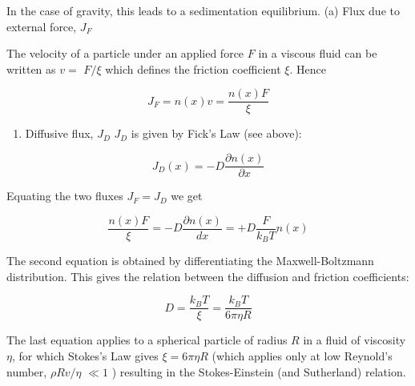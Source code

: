 \documentclass[
  letterpaper,
  enabledeprecatedfontcommands]{report}
\providecommand{\tightlist}{%
  \setlength{\itemsep}{0pt}\setlength{\parskip}{0pt}}
\begin{document}
In the case of gravity, this leads to a sedimentation equilibrium. (a)
Flux due to external force, \(J_{F}\)

The velocity of a particle under an applied force \(F\) in a viscous
fluid can be written as \(v=\) \(F / \xi\) which defines the friction
coefficient \(\xi\). Hence

\[
J_{F}=n(x) v=\frac{n(x) F}{\xi}
\]

\begin{enumerate}
\def\labelenumi{(\alph{enumi})}
\setcounter{enumi}{1}
\tightlist
\item
  Diffusive flux, \(J_{D}\) \(J_{D}\) is given by Fick's Law (see
  above):
\end{enumerate}

\[
J_{D}(x)=-D \frac{\partial n(x)}{\partial x}
\]

Equating the two fluxes \(J_{F}=J_{D}\) we get

\[
\frac{n(x) F}{\xi}=-D \frac{\partial n(x)}{d x}=+D \frac{F}{k_{B} T} n(x)
\]

The second equation is obtained by differentiating the Maxwell-Boltzmann
distribution. This gives the relation between the diffusion and friction
coefficients:

\[
D=\frac{k_{B} T}{\xi}=\frac{k_{B} T}{6 \pi \eta R}
\]

The last equation applies to a spherical particle of radius \(R\) in a
fluid of viscosity \(\eta\), for which Stokes's Law gives
\(\xi=6 \pi \eta R\) (which applies only at low Reynold's number,
\(\rho R v / \eta\) \(\ll 1\) ) resulting in the Stokes-Einstein (and
Sutherland) relation.
\end{document}
